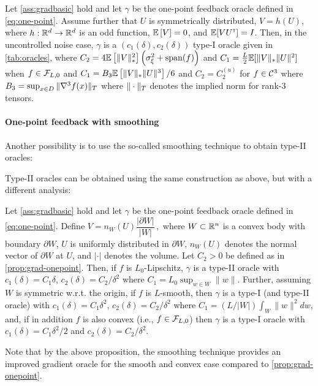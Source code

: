 \begin{proposition}
\label{prop:grad-onepoint}
Let \cref{ass:gradbasic} hold and let $\gamma$ be the one-point feedback oracle defined in \eqref{eq:one-point}.
Assume further that
  $U$ is symmetrically distributed,
  $V = h(U)$, where $h:\mathbb{R}^d \to \mathbb{R}^d$ is an odd function,
  $\mathbb{E}\left[V\right]=0$, and $\mathbb{E}[V U^\mathsf{\scriptscriptstyle T}] = I$.
Then, in the uncontrolled noise case, $\gamma$ is a $(c_1(\delta),c_2(\delta))$ type-I oracle given in \cref{tab:oracles}, where 
$C_2=4 \mathbb{E}\left[\|V\|_*^2\right]\left( \sigma_\xi^2+\operatorname{span}(f)\right)$ and $C_1 =
\frac{L}{2} \mathbb{E}[ \|V\|_* \|U\|^2]$ when $f \in \mathcal{F}_{L,0}$ and  
$C_1 = B_3 \mathbb{E}\left[ \|V\|_* \|U\|^3 \right]/6$ and $C_2 =  C_{2}^{(u)}$ for  $f \in \mathcal{C}^3$ where $B_3 = \sup_{x\in D} \| \nabla^3 f(x) \|_T$ where $\|\cdot\|_T$ denotes the implied norm for rank-3 tensors.  
\end{proposition}

\paragraph{One-point feedback with smoothing}
Another possibility is to use the so-called smoothing technique
\citep{PoTsy90,flaxman2005online,HaLe14:SOC}
to obtain type-II oracles:


Type-II oracles can be obtained using the same construction as above, but with a different analysis:
\begin{proposition}
\label{prop:flaxman} Let \cref{ass:gradbasic} hold and let $\gamma$ be the one-point feedback oracle defined in \eqref{eq:one-point}.
Define
$
V = n_W(U)\dfrac{\lvert \partial W\rvert}{\lvert W \rvert}\,,
$
where $W \subset \mathbb{R}^n$ is a convex body with boundary $\partial W$, $U$ is uniformly distributed in $\partial W$, $n_W(U)$ denotes the normal vector of $\partial W$ at $U$, and $\lvert \cdot \rvert$ denotes the volume. Let $C_2>0$ be defined as in \cref{prop:grad-onepoint}.
Then, if $f$ is $L_0$-Lipschitz, $\gamma$ is a type-II oracle with $c_1(\delta)=C_1 \delta$, $c_2(\delta) = C_2/\delta^2$ where
$C_1=L_0 \sup_{w \in W}\|w\|$. 
Further, assuming $W$ is symmetric w.r.t. the origin, if $f$ is $L$-smooth, then $\gamma$ is a type-I (and type-II oracle) with $c_1(\delta) = C_1\delta^2$, $c_2(\delta) = C_2/\delta^2$ where $C_1=(L/|W|)\int_W\|w\|^2 dw$, and, if in addition $f$ is also convex (i.e., $f\in \mathcal{F}_{L,0}$) then $\gamma$ is a type-I oracle with $c_1(\delta)=C_1 \delta^2/2$ and $c_2(\delta)=C_2/\delta^2$.
\end{proposition}
Note that by the above proposition, the smoothing technique provides an improved gradient oracle for the smooth and convex case compared to \cref{prop:grad-onepoint}.



